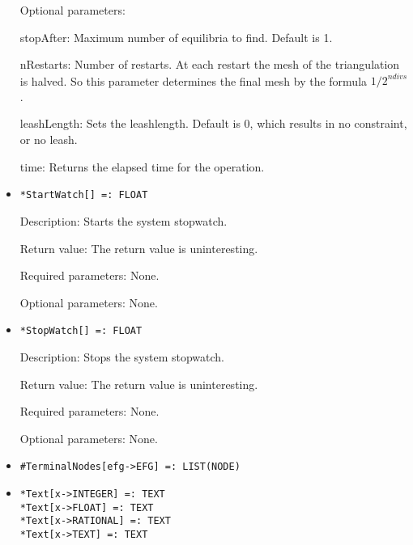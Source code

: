 \begin{itemize}
\item
[Optional parameters:]\hfil\null
	
\bd
\item
[stopAfter:] Maximum number of equilibria to find. Default is 1.  
\item 
[nRestarts:] Number of restarts.  At each restart the mesh of the
triangulation is halved.  So this parameter determines the final mesh
by the formula ${1/2}^{ndivs}$.
\item
[leashLength:] Sets the leashlength. Default is 0, which results in no
constraint, or no leash.  
\item
[time:] Returns the elapsed time for the operation.
\ed
\ed

\item

\protect \large \begin{verbatim}
*StartWatch[] =: FLOAT
\end{verbatim}\normalsize

\bd
\item
[Description:] Starts the system stopwatch.
\item
[Return value:] The return value is uninteresting.
\item
[Required parameters:] None.
\item
[Optional parameters:] None.
\ed

\item
\protect \large \begin{verbatim}
*StopWatch[] =: FLOAT
\end{verbatim}\normalsize

\bd
\item
[Description:] Stops the system stopwatch.
\item
[Return value:] The return value is uninteresting.
\item
[Required parameters:] None.
\item
[Optional parameters:] None.
\ed


\item
\protect \large \begin{verbatim} 
#TerminalNodes[efg->EFG] =: LIST(NODE)
\end{verbatim}\normalsize

\item
\protect \large \begin{verbatim}
*Text[x->INTEGER] =: TEXT
*Text[x->FLOAT] =: TEXT
*Text[x->RATIONAL] =: TEXT
*Text[x->TEXT] =: TEXT
\end{verbatim} \normalsize


\end{itemize}
